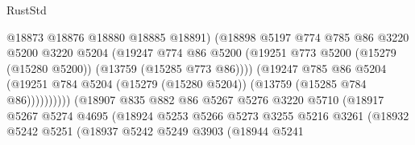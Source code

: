 \begin{lexlean}{RustStd}
\begin{coremodule}
                                      @18873
                                      @18876
                                      @18880
                                      @18885
                                      @18891)
                                    (@18898
                                      @5197
                                      @774
                                      @785
                                      @86
                                      @3220
                                      @5200
                                      @3220
                                      @5204
                                      (@19247
                                        @774
                                        @86
                                        @5200
                                        (@19251
                                          @773
                                          @5200
                                          (@15279 (@15280 @5200))
                                          (@13759 (@15285 @773 @86))))
                                      (@19247
                                        @785
                                        @86
                                        @5204
                                        (@19251
                                          @784
                                          @5204
                                          (@15279 (@15280 @5204))
                                          (@13759 (@15285 @784 @86))))))))))
                          (@18907
                            @835
                            @882
                            @86
                            @5267
                            @5276
                            @3220
                            @5710
                            (@18917
                              @5267
                              @5274
                              @4695
                              (@18924
                                @5253
                                @5266
                                @5273
                                @3255
                                @5216
                                @3261
                                (@18932
                                  @5242
                                  @5251
                                  (@18937
                                    @5242
                                    @5249
                                    @3903
                                    (@18944
                                      @5241

\end{coremodule}
\end{lexlean}
